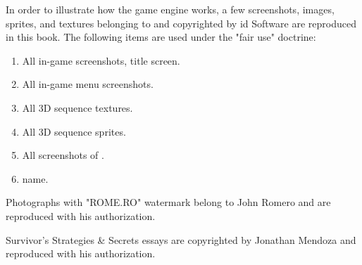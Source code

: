 In order to illustrate how the \doom{} game engine works, a few screenshots, images, sprites, and textures belonging to and copyrighted by id Software are reproduced in this book. The following items are used under the "fair use" doctrine:\\
\par
\begin{enumerate}
	\item All in-game screenshots, title screen.
	\item All in-game menu screenshots.
	\item All 3D sequence textures.
    \item All 3D sequence sprites.
    \item All screenshots of \doom.
    \item \doom{} name.
\end{enumerate}
\par
Photographs with "ROME.RO" watermark belong to John Romero and are reproduced with his authorization.\\
\par
\doom{} Survivor's Strategies \& Secrets essays are copyrighted by Jonathan Mendoza and reproduced with his authorization.\\
